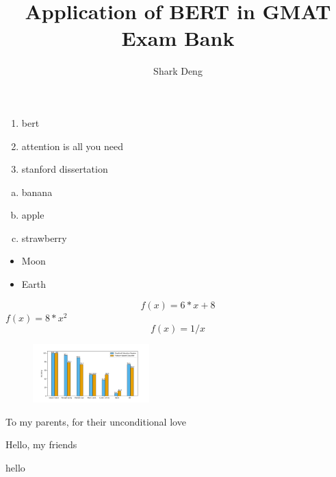 \documentclass[a4paper] {report}
\begin{document}
\title {Application of BERT in GMAT Exam Bank}
\author {Shark Deng}

\begin {enumerate}
	\item bert
	\item attention is all you need
	\item stanford dissertation
\end {enumerate}

\begin {enumerate} [a)]
	\item banana
	\item apple
	\item strawberry
\end {enumerate}

\begin {itemize}
	\item Moon
	\item Earth
\end {itemize}


\begin {equation} %
	f(x) = 6*x+8
\end {equation}
$f(x) = 8*x^2$ %
$$f(x) = 1/x$$  %


\begin{figure}
	\includegraphics [width=1.77in] {../../20190117/img/cnn_analysis.png}
\end {figure}

\begin {flushright}
	To my parents, for their unconditional love
\end {flushright}

\begin {flushleft}
	Hello, my friends
\end {flushleft}

\newpage
\begin {flushright}
	hello
\end {flushright}
\end{document}
